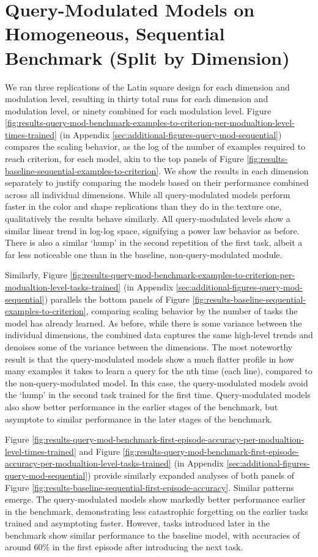\FloatBarrier
\section{Query-Modulated Models on Homogeneous, Sequential Benchmark (Split by Dimension)\label{res:query-mod-by-dimension}}
We ran three replications of the Latin square design for each dimension and modulation level, resulting in thirty total runs for each dimension and modulation level, or ninety combined for each modulation level. Figure \ref{fig:results-query-mod-benchmark-examples-to-criterion-per-modualtion-level-times-trained} (in Appendix \ref{sec:additional-figures-query-mod-sequential}) compares the scaling behavior, as the log of the number of examples required to reach criterion, for each model, akin to the top panels of Figure \ref{fig:results-baseline-sequential-examples-to-criterion}. We show the results in each dimension separately to justify comparing the models based on their performance combined across all individual dimensions. While all query-modulated models perform faster in the color and shape replications than they do in the texture one, qualitatively the results behave similarly. All query-modulated levels show a similar linear trend in log-log space, signifying a power law behavior as before. There is also a similar ‘hump’ in the second repetition of the first task, albeit a far less noticeable one than in the baseline, non-query-modulated module. 

Similarly, Figure \ref{fig:results-query-mod-benchmark-examples-to-criterion-per-modualtion-level-tasks-trained} (in Appendix \ref{sec:additional-figures-query-mod-sequential}) parallels the bottom panels of Figure \ref{fig:results-baseline-sequential-examples-to-criterion}, comparing scaling behavior by the number of tasks the model has already learned. As before, while there is some variance between the individual dimensions, the combined data captures the same high-level trends and denoises some of the variance between the dimensions. The most noteworthy result is that the query-modulated models show a much flatter profile in how many examples it takes to learn a query for the nth time (each line), compared to the non-query-modulated model. In this case, the query-modulated models avoid the ‘hump’ in the second task trained for the first time. Query-modulated models also show better performance in the earlier stages of the benchmark, but asymptote to similar performance in the later stages of the benchmark.

Figure \ref{fig:results-query-mod-benchmark-first-episode-accuracy-per-modualtion-level-times-trained} and Figure \ref{fig:results-query-mod-benchmark-first-episode-accuracy-per-modualtion-level-tasks-trained} (in Appendix \ref{sec:additional-figures-query-mod-sequential}) provide similarly expanded analyses of both panels of Figure \ref{fig:results-baseline-sequential-first-episode-accuracy}. Similar patterns emerge. The query-modulated models show markedly better performance earlier in the benchmark, demonstrating less catastrophic forgetting on the earlier tasks trained and asymptoting faster. However, tasks introduced later in the benchmark show similar performance to the baseline model, with accuracies of around 60\% in the first episode after introducing the next task. 